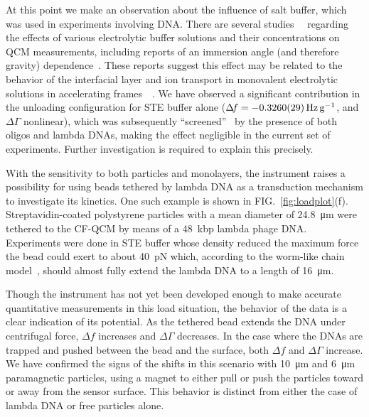 \documentclass[floatfix,superscriptaddress,a4paper,twocolumn]{revtex4-1}
\newcommand{\Figure}[1]{FIG.~\ref{#1}}
\newcommand{\df}{\Delta\!f}
\newcommand{\dg}{\Delta\Gamma}
\begin{document}
At this point we make an observation about the influence of salt buffer,
which was used in experiments involving DNA.  There are several
studies~\cite{encarnaccao2007influence}~\cite{lin1995role} regarding the
effects of various electrolytic buffer solutions and their concentrations
on QCM measurements, including reports of an immersion angle (and therefore
gravity) dependence~\cite{yoshimoto2006characteristics}.  These reports
suggest this effect may be related to the behavior of the interfacial layer
and ion transport in monovalent electrolytic solutions in accelerating
frames~\cite{tolman1911electromotive}~\cite{des1893unpolarisirbare}.  We
have observed a significant contribution in the unloading configuration for
STE buffer alone ($\df=\SI{-0.326+-0.0029}{\hertz\per\g}$, and $\dg$
nonlinear), which was subsequently ``screened''~\cite{zhang2002insulating}
by the presence of both oligos and lambda DNAs, making the effect
negligible in the current set of experiments.  Further investigation is
required to explain this precisely.

With the sensitivity to both particles and monolayers, the instrument
raises a possibility for using beads tethered by lambda DNA as a
transduction mechanism to investigate its kinetics.  One such example is
shown in \Figure{fig:loadplot}(f).  Streptavidin-coated polystyrene
particles with a mean diameter of \SI{24.8}{\micro\meter} were tethered to
the CF-QCM by means of a \SI{48}{kbp} lambda phage DNA.  Experiments were
done in STE buffer whose density reduced the maximum force the bead could
exert to about \SI{40}{\pico\newton} which, according to the worm-like
chain model~\cite{marko1995stretching}, should almost fully extend the
lambda DNA to a length of \SI{16}{\micro\meter}.

Though the instrument has not yet been developed enough to make accurate
quantitative measurements in this load situation, the behavior of the data
is a clear indication of its potential.  As the tethered bead extends the
DNA under centrifugal force, $\df$ increases and $\dg$ decreases.  In the
case where the DNAs are trapped and pushed between the bead and the
surface, both $\df$ and $\dg$ increase.  We have confirmed the signs of the
shifts in this scenario with \SI{10}{\micro\meter} and \SI{6}{\micro\meter}
paramagnetic particles, using a magnet to either pull or push the
particles toward or away from the sensor surface.  This behavior is
distinct from either the case of lambda DNA or free particles alone.
\end{document}
